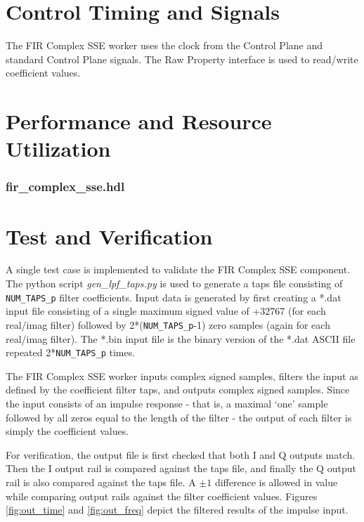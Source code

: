 \documentclass{article}
\def\comp{fir\_complex\_sse}
\edef\ecomp{fir_complex_sse}
\begin{document}
\section*{Control Timing and Signals}
\begin{flushleft}
	The FIR Complex SSE worker uses the clock from the Control Plane and standard Control Plane signals. The Raw Property interface is used to read/write coefficient values.
\end{flushleft}

\section*{Performance and Resource Utilization}
\subsubsection*{\comp.hdl}

\section*{Test and Verification}
\begin{flushleft}
A single test case is implemented to validate the FIR Complex SSE component. The python script \textit{gen\_lpf\_taps.py} is used to generate a taps file consisting of \verb+NUM_TAPS_p+ filter coefficients. Input data is generated by first creating a *.dat input file consisting of a single maximum signed value of +32767 (for each real/imag filter) followed by 2*(\verb+NUM_TAPS_p+-1) zero samples (again for each real/imag filter). The *.bin input file is the binary version of the *.dat ASCII file repeated 2*\verb+NUM_TAPS_p+ times.\medskip

The FIR Complex SSE worker inputs complex signed samples, filters the input as defined by the coefficient filter taps, and outputs complex signed samples. Since the input consists of an impulse response - that is, a maximal `one' sample followed by all zeros equal to the length of the filter - the output of each filter is simply the coefficient values.\medskip

For verification, the output file is first checked that both I and Q outputs match. Then the I output rail is compared against the taps file, and finally the Q output rail is also compared against the taps file. A $\pm1$ difference is allowed in value while comparing output rails against the filter coefficient values. Figures \ref{fig:out_time} and \ref{fig:out_freq} depict the filtered results of the impulse input.
\end{flushleft}
\end{document}
